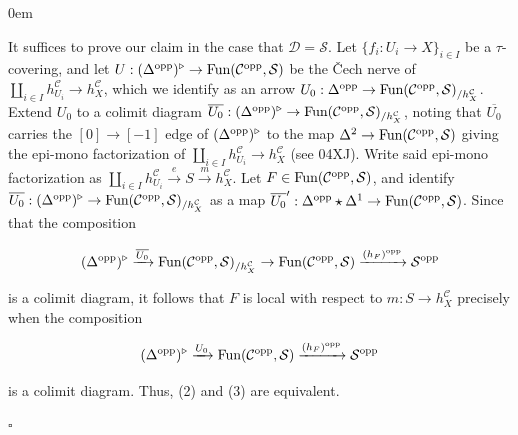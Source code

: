 \documentclass[10pt]{article}
\newcommand{\mS}{\mathcal S}
\newcommand{\C}{\mathcal C}
\newcommand{\cD}{\mathcal{D}}
\renewcommand{\qed}{\hfill$\square$}
\renewenvironment{proof}{\begin{addmargin}[1em]{0em}\begin{newproof}}{\end{newproof}\end{addmargin}\qed}
\theoremstyle{witharg}
\theoremstyle{witharg}
\theoremstyle{witharg2}
\begin{document}
\begin{proof} 




It suffices to prove our claim in the case that $\cD=\mS$. Let $\{f_i:U_i\rightarrow X\}_{i\in I}$ be a $\tau$-covering, and let $U:(\Delta^{\textnormal{opp}})^\triangleright\rightarrow \textnormal{Fun}(\C^{\textnormal{opp}},\mS)$ be the \v{C}ech nerve of $\coprod_{i\in I}h^\C_{U_i}\rightarrow h^\C_X$, which we identify as an arrow $U_0:\Delta^{\textnormal{opp}}\rightarrow \textnormal{Fun}(\C^{\textnormal{opp}},\mS)_{/h^\C_X}$. Extend $U_0$ to a colimit diagram $\overline{U_0}:(\Delta^{\textnormal{opp}})^\triangleright\rightarrow \textnormal{Fun}(\C^{\textnormal{opp}},\mS)_{/h^\C_X}$, noting that $\overline{U_0}$ carries the $[0]\rightarrow [-1]$ edge of $(\Delta^{\textnormal{opp}})^\triangleright$ to the map $\Delta^2\rightarrow \textnormal{Fun}(\C^{\textnormal{opp}},\mS)$ giving the epi-mono factorization of $\coprod_{i\in I}h^\C_{U_i}\rightarrow h^\C_X$ (see  04XJ). Write said epi-mono factorization as $\coprod_{i\in I}h^\C_{U_i}\xrightarrow{e}S\xrightarrow{m}h^\C_X$. Let  $F\in \textnormal{Fun}(\C^{\textnormal{opp}},\mS)$,  and identify $\overline{U_0}:(\Delta^{\textnormal{opp}})^\triangleright\rightarrow \textnormal{Fun}(\C^{\textnormal{opp}},\mS)_{/h^\C_X}$ as a map $\overline{U_0}^\prime:\Delta^{\textnormal{opp}}\star \Delta^1\rightarrow \textnormal{Fun}(\C^{\textnormal{opp}},\mS)$. Since that the composition 

$$(\Delta^{\textnormal{opp}})^\triangleright\xrightarrow{\overline{U_0}} \textnormal{Fun}(\C^{\textnormal{opp}},\mS)_{/h^\C_X}\rightarrow \textnormal{Fun}(\C^{\textnormal{opp}},\mS)\xrightarrow{(h_F)^{\textnormal{opp}}}\mS^{\textnormal{opp}}$$

\noindent is a colimit diagram, it follows that $F$ is local with respect to $m:S\rightarrow h^\C_X$ precisely when the composition 

$$(\Delta^{\textnormal{opp}})^\triangleright\xrightarrow{U_0} \textnormal{Fun}(\C^{\textnormal{opp}},\mS)\xrightarrow{(h_F)^{\textnormal{opp}}}\mS^{\textnormal{opp}}$$

\noindent is a colimit diagram. Thus, (2) and (3) are equivalent.


\end{proof}
\end{document}

